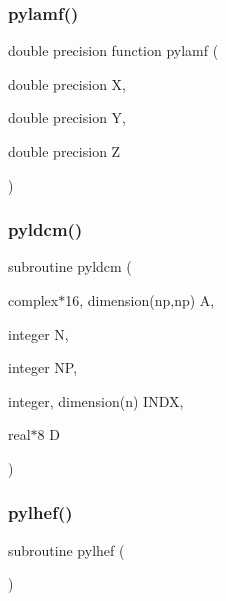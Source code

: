 \subsubsection{\texorpdfstring{pylamf()}{pylamf()}}
{\footnotesize\ttfamily double precision function pylamf (\begin{DoxyParamCaption}\item[{double precision}]{X,  }\item[{double precision}]{Y,  }\item[{double precision}]{Z }\end{DoxyParamCaption})}

\mbox{\label{pythia-6_84_824_8f_a465ce78bf5535730bbe484acfcdb5574}} 
\subsubsection{\texorpdfstring{pyldcm()}{pyldcm()}}
{\footnotesize\ttfamily subroutine pyldcm (\begin{DoxyParamCaption}\item[{complex$\ast$16, dimension(np,np)}]{A,  }\item[{integer}]{N,  }\item[{integer}]{NP,  }\item[{integer, dimension(n)}]{I\+N\+DX,  }\item[{real$\ast$8}]{D }\end{DoxyParamCaption})}

\mbox{\label{pythia-6_84_824_8f_a2a33a24facc5f203a1b7ecccd4374c93}} 
\subsubsection{\texorpdfstring{pylhef()}{pylhef()}}
{\footnotesize\ttfamily subroutine pylhef (\begin{DoxyParamCaption}{ }\end{DoxyParamCaption})}

\mbox{\label{pythia-6_84_824_8f_acc54128638bbd93cf630e1576f91d443}} 
